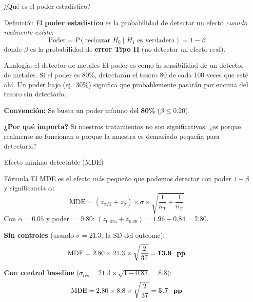 \documentclass[aspectratio=169, 11pt]{beamer}
\begin{document}
\begin{frame}{¿Qué es el poder estadístico?}
\begin{block}{Definición}
El \textbf{poder estadístico} es la probabilidad de detectar un efecto \textit{cuando realmente existe}:
\[
\text{Poder} = P(\text{rechazar } H_0 \mid H_1 \text{ es verdadera}) = 1 - \beta
\]
donde $\beta$ es la probabilidad de \textbf{error Tipo II} (no detectar un efecto real).
\end{block}

\vspace{0.2cm}
\begin{exampleblock}{Analogía: el detector de metales}
\small
El poder es como la sensibilidad de un detector de metales. Si el poder es 80\%, detectarán el tesoro 80 de cada 100 veces que esté ahí. Un poder bajo (ej.\ 30\%) significa que probablemente pasarán por encima del tesoro sin detectarlo.
\end{exampleblock}

\vspace{0.2cm}
\textbf{Convención:} Se busca un poder mínimo del \textbf{80\%} ($\beta \leq 0.20$).

\vspace{0.1cm}
{\small \textbf{¿Por qué importa?} Si nuestros tratamientos no son significativos, ¿es porque realmente no funcionan o porque la muestra es demasiado pequeña para detectarlo?}
\end{frame}

\begin{frame}{Efecto mínimo detectable (MDE)}
\begin{block}{Fórmula}
El MDE es el efecto más pequeño que podemos detectar con poder $1 - \beta$ y significancia $\alpha$:
\[
\text{MDE} = (z_{\alpha/2} + z_{\beta}) \times \sigma \times \sqrt{\frac{1}{n_T} + \frac{1}{n_C}}
\]
Con $\alpha = 0.05$ y poder $= 0.80$: $(z_{0.025} + z_{0.20}) = 1.96 + 0.84 = 2.80$.
\end{block}

\vspace{0.2cm}
\textbf{Sin controles} (usando $\sigma = 21.3$, la SD del outcome):
\[
\text{MDE} = 2.80 \times 21.3 \times \sqrt{\frac{2}{37}} = \textbf{13.9 \text{ pp}}
\]

\textbf{Con control baseline} ($\sigma_{\text{res}} = 21.3 \times \sqrt{1 - 0.83} = 8.8$):
\[
\text{MDE} = 2.80 \times 8.8 \times \sqrt{\frac{2}{37}} = \textbf{5.7 \text{ pp}}
\]
\end{frame}
\end{document}
